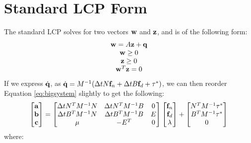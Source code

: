 \section{Standard LCP Form}
The standard LCP solves for two vectors $\mathbf{w}$ and $\mathbf{z}$, and is of the following form:
\begin{equation}
\begin{array}{cc}
\mathbf{w} = A\mathbf{z} + \mathbf{q} \\
\mathbf{w} \geq 0 \\
\mathbf{z} \geq 0 \\
\mathbf{w}^T\mathbf{z} = 0
\end{array}
\end{equation}
If we express $\dot{\mathbf{q}}$, as $\dot{\mathbf{q}} = M^{-1}(\Delta t
N\mathbf{f}_n + \Delta t B\mathbf{f}_d + \tau^*)$, we can then reorder Equation \ref{eq:bigsystem} slightly to get the following:
\begin{equation}
\label{eq:slcp0}
\left[\begin{matrix}\mathbf{a} \\ \mathbf{b} \\ \mathbf{c}\end{matrix}\right] =
\left[\begin{matrix}\Delta t N^TM^{-1}N & \Delta t N^TM^{-1}B & 0 \\ \Delta t B^TM^{-1}N & \Delta t B^TM^{-1}B & E \\ \mu & -E^T & 0\end{matrix}\right]\left[\begin{matrix}\mathbf{f}_n \\ \mathbf{f}_d \\ \lambda\end{matrix}\right] + \left[\begin{matrix}N^TM^{-1}\tau^* \\ B^TM^{-1}\tau^* \\ 0\end{matrix}\right]
\end{equation}
where:

